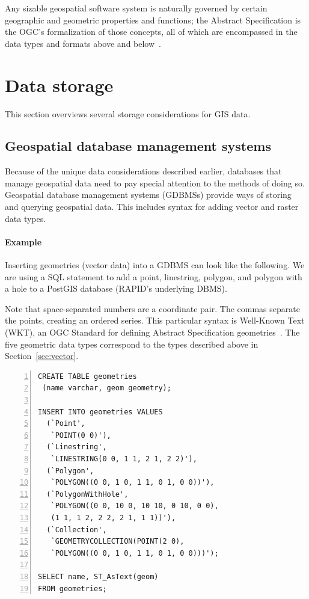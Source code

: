 Any sizable geospatial software system is naturally governed by certain geographic and geometric properties and functions; the Abstract Specification is the OGC's formalization of those concepts, all of which are encompassed in the data types and formats above and below~\cite{AbstractSpecFaq}.

\section{Data storage}
This section overviews several storage considerations for GIS data.

\subsection{Geospatial database management systems}
Because of the unique data considerations described earlier, databases that manage geospatial data need to pay special attention to the methods of doing so. Geospatial database management systems (GDBMSs) provide ways of storing and querying geospatial data. This includes syntax for adding vector and raster data types.

\paragraph{Example}
\label{background_wkt}
Inserting geometries (vector data) into a GDBMS can look like the following. We are using a SQL statement to add a point, linestring, polygon, and polygon with a hole to a PostGIS database (RAPID's underlying DBMS).

Note that space-separated numbers are a coordinate pair. The commas separate the points, creating an ordered series. This particular syntax is Well-Known Text (WKT), an OGC Standard for defining Abstract Specification geometries~\cite{ogc}. The five geometric data types correspond to the types described above in Section~\ref{sec:vector}.

\begin{Verbatim}[samepage=true,baselinestretch=1,numbers=left,xleftmargin=12mm]
CREATE TABLE geometries
 (name varchar, geom geometry);

INSERT INTO geometries VALUES
  (`Point',
   `POINT(0 0)'),
  (`Linestring',
   `LINESTRING(0 0, 1 1, 2 1, 2 2)'),
  (`Polygon',
   `POLYGON((0 0, 1 0, 1 1, 0 1, 0 0))'),
  (`PolygonWithHole',
   `POLYGON((0 0, 10 0, 10 10, 0 10, 0 0),
   (1 1, 1 2, 2 2, 2 1, 1 1))'),
  (`Collection',
   `GEOMETRYCOLLECTION(POINT(2 0),
   `POLYGON((0 0, 1 0, 1 1, 0 1, 0 0)))');

SELECT name, ST_AsText(geom)
FROM geometries;
\end{Verbatim}

